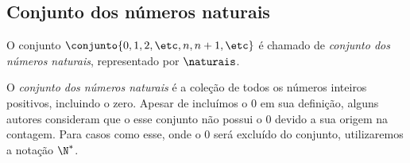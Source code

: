 \subsection{Conjunto dos números naturais}

O conjunto $\conjunto{0, 1, 2, \etc , n, n+1, \etc}$ é chamado de \emph{conjunto dos números naturais}, representado por $\naturais$.

O \emph{conjunto dos números naturais} é a coleção de todos os números inteiros positivos, incluindo o zero. Apesar de incluímos o 0 em sua definição, alguns autores consideram que o esse conjunto não possui o 0 devido a sua origem na contagem. Para casos como esse, onde o 0 será excluído do conjunto, utilizaremos a notação $\N^*$.
